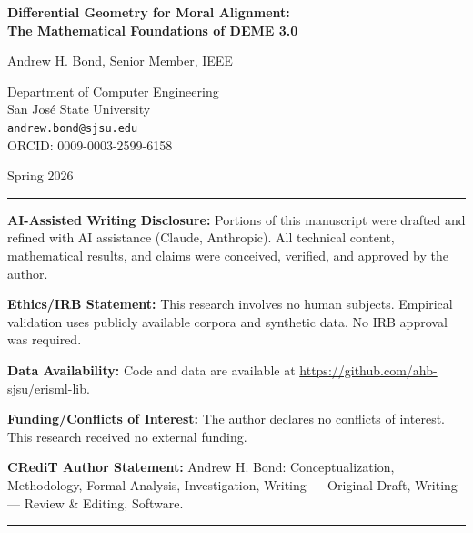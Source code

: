 \documentclass[12pt,letterpaper]{article}
\begin{document}
\begin{titlepage}
\centering
\vspace*{2cm}

{\LARGE\bfseries Differential Geometry for Moral Alignment:\\The Mathematical Foundations of DEME 3.0\par}

\vspace{2cm}

{\large Andrew H. Bond, Senior Member, IEEE\par}
\vspace{0.5cm}
{\normalsize Department of Computer Engineering\\
San Jos\'{e} State University\\
\texttt{andrew.bond@sjsu.edu}\\
ORCID: 0009-0003-2599-6158\par}

\vspace{1cm}

{\normalsize Spring 2026\par}

\vfill

\noindent\rule{\textwidth}{0.4pt}
\small

\noindent\textbf{AI-Assisted Writing Disclosure:} Portions of this manuscript were drafted and refined with AI assistance (Claude, Anthropic). All technical content, mathematical results, and claims were conceived, verified, and approved by the author.

\vspace{0.5em}
\noindent\textbf{Ethics/IRB Statement:} This research involves no human subjects. Empirical validation uses publicly available corpora and synthetic data. No IRB approval was required.

\vspace{0.5em}
\noindent\textbf{Data Availability:} Code and data are available at \url{https://github.com/ahb-sjsu/erisml-lib}.

\vspace{0.5em}
\noindent\textbf{Funding/Conflicts of Interest:} The author declares no conflicts of interest. This research received no external funding.

\vspace{0.5em}
\noindent\textbf{CRediT Author Statement:} Andrew H. Bond: Conceptualization, Methodology, Formal Analysis, Investigation, Writing --- Original Draft, Writing --- Review \& Editing, Software.

\normalsize
\noindent\rule{\textwidth}{0.4pt}

\end{titlepage}
\end{document}
